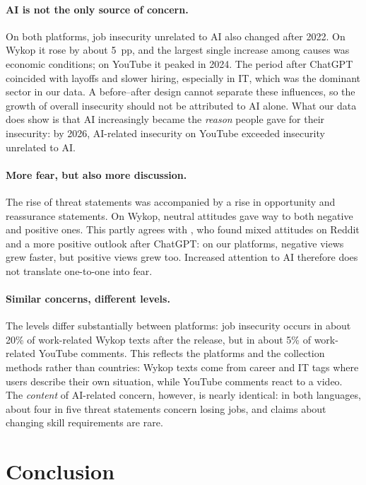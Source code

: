 \documentclass[11pt]{article}
\begin{document}
\paragraph{AI is not the only source of concern.} On both platforms, job
insecurity unrelated to AI also changed after 2022. On Wykop it rose by about
5~pp, and the largest single increase among causes was economic conditions; on
YouTube it peaked in 2024. The period after ChatGPT coincided with layoffs and
slower hiring, especially in IT, which was the dominant sector in our data. A
before--after design cannot separate these influences, so the growth of overall
insecurity should not be attributed to AI alone. What our data does show is that
AI increasingly became the \emph{reason} people gave for their insecurity: by
2026, AI-related insecurity on YouTube exceeded insecurity unrelated to AI.

\paragraph{More fear, but also more discussion.} The rise of threat statements
was accompanied by a rise in opportunity and reassurance statements. On Wykop,
neutral attitudes gave way to both negative and positive ones. This partly
agrees with \citet{fodor2026}, who found mixed attitudes on Reddit and a
more positive outlook after ChatGPT: on our platforms, negative views grew
faster, but positive views grew too. Increased attention to AI therefore does
not translate one-to-one into fear.

\paragraph{Similar concerns, different levels.} The levels differ
substantially between platforms: job insecurity occurs in about 20\% of
work-related Wykop texts after the release, but in about 5\% of work-related
YouTube comments. This reflects the platforms and the collection methods rather
than countries: Wykop texts come from career and IT tags where users describe
their own situation, while YouTube comments react to a video. The
\emph{content} of AI-related concern, however, is nearly identical: in both
languages, about four in five threat statements concern losing jobs, and claims
about changing skill requirements are rare.


\section{Conclusion}
\label{sec:conclusion}
\end{document}
